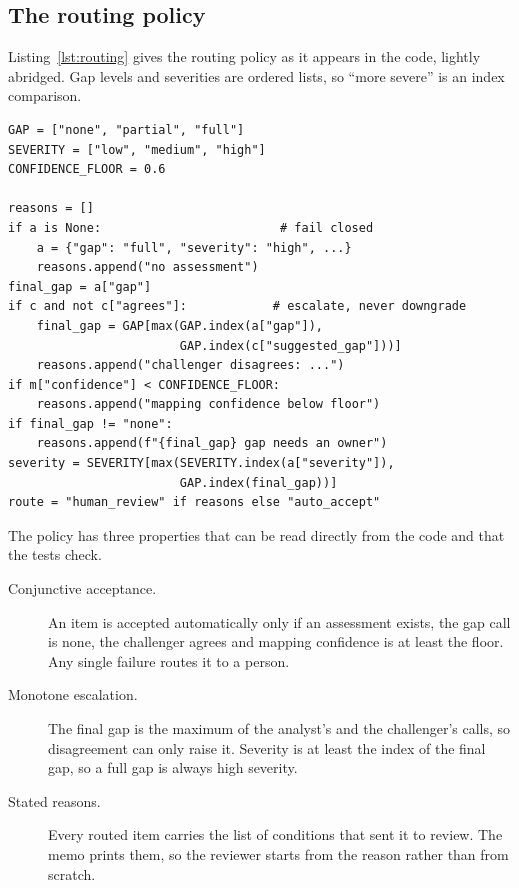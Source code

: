 \documentclass[sigconf,review,anonymous]{acmart}
\newcommand{\gapnone}{\textsf{none}}
\newcommand{\gapfull}{\textsf{full}}
\begin{document}
\subsection{The routing policy}
\label{sec:routing}

Listing~\ref{lst:routing} gives the routing policy as it appears in the
code, lightly abridged. Gap levels and severities are ordered lists, so
``more severe'' is an index comparison.

\begin{lstlisting}[float=t, caption={Routing policy (abridged from \texttt{pipeline.py}).}, label={lst:routing}]
GAP = ["none", "partial", "full"]
SEVERITY = ["low", "medium", "high"]
CONFIDENCE_FLOOR = 0.6

reasons = []
if a is None:                         # fail closed
    a = {"gap": "full", "severity": "high", ...}
    reasons.append("no assessment")
final_gap = a["gap"]
if c and not c["agrees"]:            # escalate, never downgrade
    final_gap = GAP[max(GAP.index(a["gap"]),
                        GAP.index(c["suggested_gap"]))]
    reasons.append("challenger disagrees: ...")
if m["confidence"] < CONFIDENCE_FLOOR:
    reasons.append("mapping confidence below floor")
if final_gap != "none":
    reasons.append(f"{final_gap} gap needs an owner")
severity = SEVERITY[max(SEVERITY.index(a["severity"]),
                        GAP.index(final_gap))]
route = "human_review" if reasons else "auto_accept"
\end{lstlisting}

The policy has three properties that can be read directly from the code and
that the tests check.

\begin{description}
  \item[Conjunctive acceptance.] An item is accepted automatically only if
  an assessment exists, the gap call is \gapnone{}, the challenger agrees and
  mapping confidence is at least the floor. Any single failure routes it to
  a person.
  \item[Monotone escalation.] The final gap is the maximum of the analyst's
  and the challenger's calls, so disagreement can only raise it. Severity is
  at least the index of the final gap, so a \gapfull{} gap is always high
  severity.
  \item[Stated reasons.] Every routed item carries the list of conditions
  that sent it to review. The memo prints them, so the reviewer starts from
  the reason rather than from scratch.
\end{description}
\end{document}
